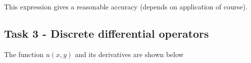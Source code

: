 \documentclass[paper=a4, fontsize=12pt]{article} %
\begin{document}
This expression gives a reasonable accuracy (depends on application of course).






% 
%
%
%
%
%

\subsection*{Task 3 - Discrete differential operators}

The function $u(x,y)$ and its derivatives are shown below
\end{document}
